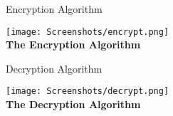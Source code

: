 \begin{frame}{Encryption Algorithm}
    \begin{center}
        \texttt{[image: Screenshots/encrypt.png]}\\ 
        \textbf{The Encryption Algorithm}
    \end{center}
\end{frame}


\begin{frame}{Decryption Algorithm}
    \begin{center}
        \texttt{[image: Screenshots/decrypt.png]} \\ 
            \textbf{The Decryption Algorithm}
    \end{center}
\end{frame}
